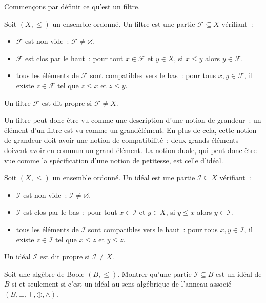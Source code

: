 Commençons par définir ce qu'est un filtre.

\begin{definition}[Filtre]
  Soit $(X,\leq)$ un ensemble ordonné. Un filtre est une partie
  $\mathcal F\subseteq X$ vérifiant~:
  \begin{itemize}
  \item $\mathcal F$ est non vide~: $\mathcal F \neq\varnothing$.
  \item $\mathcal F$ est clos par le haut~: pour tout $x\in \mathcal F$ et
    $y\in X$, si $x\leq y$ alors $y\in \mathcal F$.
  \item tous les éléments de $\mathcal F$ sont compatibles vers le bas~: pour
    tous $x,y\in\mathcal F$, il existe $z\in\mathcal F$ tel que $z\leq x$ et
    $z\leq y$.
  \end{itemize}

  Un filtre $\mathcal F$ est dit propre si $\mathcal F \neq X$.
\end{definition}

Un filtre peut donc être vu comme une description d'une notion de grandeur~:
un élément d'un filtre est vu comme un \og grand\fg élément. En plus de cela,
cette notion de grandeur doit avoir une notion de compatibilité~: deux grands
éléments doivent avoir en commun un grand élément. La notion duale, qui peut
donc être vue comme la spécification d'une notion de petitesse, est celle
d'idéal.

\begin{definition}[Idéal]
  Soit $(X,\leq)$ un ensemble ordonné. Un idéal est une partie
  $\mathcal I \subseteq X$ vérifiant~:
  \begin{itemize}
  \item $\mathcal I$ est non vide~: $\mathcal I \neq\varnothing$.
  \item $\mathcal I$ est clos par le bas~: pour tout $x\in \mathcal I$ et
    $y\in X$, si $y\leq x$ alors $y\in \mathcal I$.
  \item tous les éléments de $\mathcal I$ sont compatibles vers le haut~:
    pour tous $x,y\in \mathcal I$, il existe $z\in \mathcal I$ tel que
    $x\leq z$ et $y\leq z$.
  \end{itemize}

  Un idéal $\mathcal I$ est dit propre si $\mathcal I \neq X$.
\end{definition}

\begin{definition}
  Soit une algèbre de Boole $(B,\leq)$. Montrer qu'une partie
  $\mathcal I \subseteq B$ est un idéal de $B$ si et seulement si c'est un idéal
  au sens algébrique de l'anneau associé $(B,\bot,\top,\oplus,\land)$.
\end{definition}

